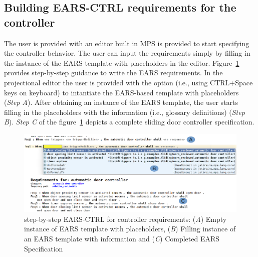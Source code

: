 \subsection{Building \textsf{EARS-CTRL} requirements for the controller}
The user is provided with an editor built in MPS
is provided to start specifying the controller behavior. The user can input the
requirements simply by filling in the instance of the EARS template with
placeholders in the editor. Figure~\ref{fig:EARS_req} provides step-by-step
guidance to write the EARS requirements. In the projectional editor the user is
provided with the option (i.e., using CTRL+Space keys on keyboard) to intantiate
the EARS-based template with placeholders (\emph{Step A}). After obtaining an
instance of the EARS template, the user starts filling in the placeholders with the information
(i.e., glossary definitions) (\emph{Step B}). \emph{Step C} of the
figure~\ref{fig:EARS_req} depicts a complete sliding door controller specification.
\begin{figure}[!h]
\centering
\includegraphics[width=1\textwidth]{./images/EARSREQSPEC.png}
\caption{step-by-step \textsf{EARS-CTRL} for controller requirements: (\emph{A}) Empty
instance of EARS template with placeholders, (\emph{B}) Filling instance of an EARS
template with information and (\emph{C}) Completed EARS Specification }
\label{fig:EARS_req}
\end{figure}
